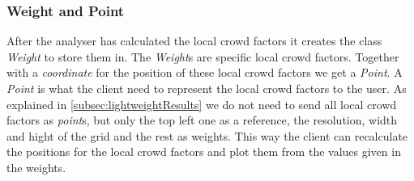 \subsubsection{Weight and Point}
After the analyser has calculated the local crowd factors it creates the class \emph{Weight} to store them in. The \emph{Weight}s are specific local crowd factors. Together with a \emph{coordinate} for the position of these local crowd factors we get a \emph{Point}. A \emph{Point} is what the client need to represent the local crowd factors to the user. As explained in \cref{subsec:lightweightResults} we do not need to send all local crowd factors as \emph{point}s, but only the top left one as a reference, the resolution, width and hight of the grid and the rest as weights. This way the client can recalculate the positions for the local crowd factors and plot them from the values given in the weights.


